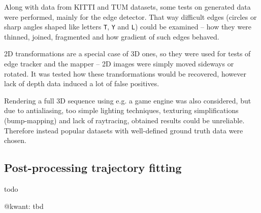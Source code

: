 Along with data from KITTI and TUM datasets, some tests on generated data were performed, mainly for the edge detector. That way difficult edges (circles or sharp angles shaped like letters \texttt{T}, \texttt{Y} and \texttt{L}) could be examined -- how they were thinned, joined, fragmented and how gradient of such edges behaved.

2D transformations are a special case of 3D ones, so they were used for tests of edge tracker and the mapper -- 2D images were simply moved sideways or rotated. It was tested how these transformations would be recovered, however lack of depth data induced a lot of false positives.

Rendering a full 3D sequence using e.g. a game engine was also considered, but due to antialiasing, too simple lighting techniques, texturing simplifications (bump-mapping) and lack of raytracing, obtained results could be unreliable. Therefore instead popular datasets with well-defined ground truth data were chosen.


\subsection{Post-processing trajectory fitting}


todo \cite{arun1987least}

@kwant: tbd

